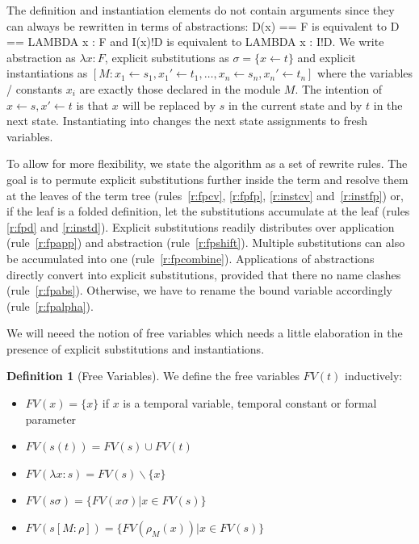 \documentclass[a4paper]{article}
\newcommand{\set}[1]{\{#1\}}
\newcommand{\fpsubstin}[1]{\{#1\}}
\newcommand{\substin}[2]{[#1:#2]}
\newcommand{\fpwith}{\leftarrow}
\newcommand{\fpwithoutset}[1]{\backslash\{#1\}}
\newcommand{\iwith}{\leftarrow}
\theoremstyle{definition}
\newtheorem{definition}{Definition}
\begin{document}
The definition and instantiation elements do not contain arguments since they
can always be rewritten in terms of abstractions: D(x) == F is equivalent to
D == LAMBDA x : F and I(x)!D is equivalent to LAMBDA x : I!D. We write
abstraction as $\lambda x : F$, explicit substitutions as
$\sigma = \fpsubstin{x \fpwith t}$ and explicit instantiations as
$\substin{M}{x_1 \iwith s_1,x_1' \iwith t_1,\ldots,x_n \iwith s_n,
  x_n' \iwith t_n}$ where the variables / constants $x_i$ are exactly those
declared in the module $M$. The intention of $x \iwith s, x' \iwith t$ is
that $x$ will be replaced by $s$ in the current state and by $t$ in the next
 state. Instantiating into \ENABLED{} changes the next state assignments to
 fresh variables.

To allow for more flexibility, we state the algorithm as a set of rewrite
rules. The goal is to permute explicit substitutions further inside the
term and resolve them at the leaves of the term tree (rules~\ref{r:fpcv},
\ref{r:fpfp}, \ref{r:instcv} and~\ref{r:instfp}) or,
if the leaf is a folded definition, let the substitutions accumulate at the
leaf (rules \ref{r:fpd} and \ref{r:instd}). Explicit substitutions readily
distributes over application (rule~\ref{r:fpapp}) and abstraction
(rule~\ref{r:fpshift}). Multiple substitutions can also be accumulated
into one (rule~\ref{r:fpcombine}).
Applications of abstractions directly convert into explicit
substitutions, provided that there no name clashes (rule~\ref{r:fpabs}).
Otherwise, we have to rename the bound variable accordingly
(rule~\ref{r:fpalpha}).

We will neeed the notion of free variables which needs a little elaboration
 in the presence of explicit substitutions and instantiations.

 \begin{definition}[Free Variables]
   We define the free variables $FV(t)$ inductively:
   \begin{itemize}
   \item $FV(x) = \set{x}$ if $x$ is a temporal variable, temporal constant or
     formal parameter
   \item $FV(s(t)) = FV(s) \cup FV(t)$
   \item $FV(\lambda x : s) = FV(s) \fpwithoutset{x}$
   \item $FV(s\sigma) = \set{FV(x\sigma) | x \in FV(s) }$
   \item $FV(s\substin{M}{\rho}) = \set{FV(\rho_M(x) ) | x \in FV(s)} $
   \end{itemize}
 \end{definition}
\end{document}
